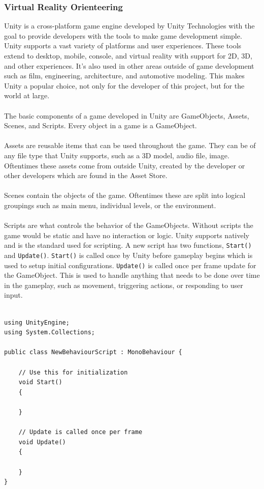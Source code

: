 \subsubsection{Virtual Reality Orienteering}
Unity is a cross-platform game engine developed by Unity Technologies with the goal to provide developers with the tools to make game development simple. Unity supports a vast variety of platforms and user experiences. These tools extend to desktop, mobile, console, and virtual reality with support for 2D, 3D, and other experiences. It's also used in other areas outside of game development such as film, engineering, architecture, and automotive modeling. This makes Unity a popular choice, not only for the developer of this project, but for the world at large.  \\
\\
The basic components of a game developed in Unity are GameObjects, Assets, Scenes, and Scripts. Every object in a game is a GameObject.\\
\\
Assets are reusable items that can be used throughout the game. They can be of any file type that Unity supports, such as a 3D model, audio file, image. Oftentimes these assets come from outside Unity, created by the developer or other developers which are found in the Asset Store. \\
\\
Scenes contain the objects of the game. Oftentimes these are split into logical groupings such as main menu, individual levels, or the environment. \\
\\
Scripts are what controls the behavior of the GameObjects. Without scripts the game would be static and have no interaction or logic. Unity supports \C natively and is the standard used for scripting. A new script has two functions, \lstinline{Start()} and \lstinline{Update()}. \lstinline{Start()} is called once by Unity before gameplay begins which is used to setup initial configurations. \lstinline{Update()} is called once per frame update for the GameObject. This is used to handle anything that needs to be done over time in the gameplay, such as movement, triggering actions, or responding to user input.  \\
\\
\begin{lstlisting}[caption=New Script in Unity]
using UnityEngine;
using System.Collections;

public class NewBehaviourScript : MonoBehaviour {

	// Use this for initialization
	void Start()
	{
	
	}
	
	// Update is called once per frame
	void Update() 
	{
	
	}
}
\end{lstlisting}

